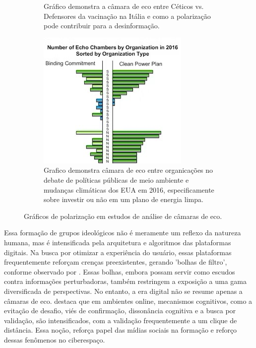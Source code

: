 \begin{figure}[htbp]
\begin{subfigure}{0.3\textwidth}
		\caption{Gráfico demonstra a câmara de eco entre Céticos vs. Defensores da vacinação na Itália e como a polarização pode contribuir para a desinformação.}
		\label{fig:echo_chamber_graph_b}
	\end{subfigure}
	\hfill
	\begin{subfigure}{0.3\textwidth}
		\includegraphics[width=\linewidth]{images/echo_chamber_graph_c.jpg}
		\caption{Grafico demonstra câmara de eco entre organicações no debate de políticas públicas de meio ambiente e mudanças climáticas dos EUA em 2016, especificamente sobre investir ou não em um plano de energia limpa.}
		\label{fig:echo_chamber_graph_c}
	\end{subfigure}
	\caption{Gráficos de polarização em estudos de análise de câmaras de eco.}
	\label{fig:echo_chamber_graph}
\end{figure}

Essa formação de grupos ideológicos não é meramente um reflexo da natureza humana, mas é intensificada pela arquitetura e algoritmos das plataformas digitais. Na busca por otimizar a experiência do usuário, essas plataformas frequentemente reforçam crenças preexistentes, gerando 'bolhas de filtro', conforme observado por . Essas bolhas, embora possam servir como escudos contra informações perturbadoras, também restringem a exposição a uma gama diversificada de perspectivas. No entanto, a era digital não se resume apenas a câmaras de eco.  destaca que em ambientes online, mecanismos cognitivos, como a evitação de desafio, viés de confirmação, dissonância cognitiva e a busca por validação, são intensificados, com a validação frequentemente a um clique de distância. Essa noção, reforça papel das mídias sociais na formação e reforço dessas fenômenos no ciberespaço.


